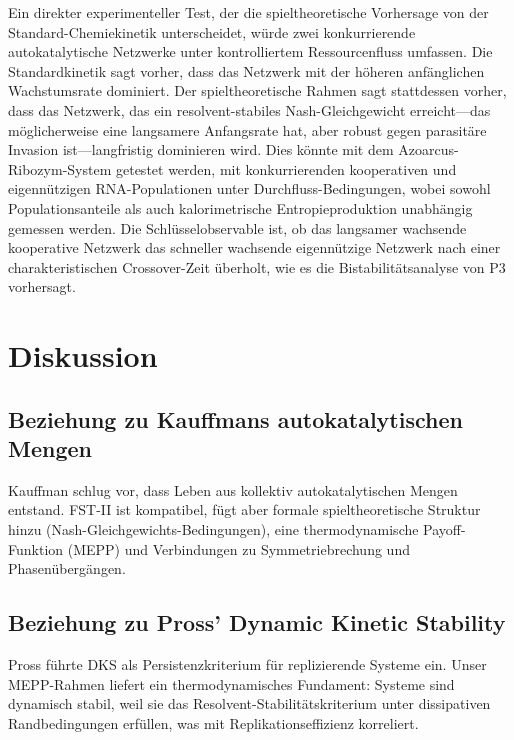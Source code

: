 \documentclass[12pt,a4paper]{article}
\theoremstyle{remark}
\begin{document}
Ein direkter experimenteller Test, der die spieltheoretische Vorhersage von der Standard-Chemiekinetik unterscheidet, w\"urde zwei konkurrierende autokatalytische Netzwerke unter kontrolliertem Ressourcenfluss umfassen. Die Standardkinetik sagt vorher, dass das Netzwerk mit der h\"oheren anf\"anglichen Wachstumsrate dominiert. Der spieltheoretische Rahmen sagt stattdessen vorher, dass das Netzwerk, das ein resolvent-stabiles Nash-Gleichgewicht erreicht---das m\"oglicherweise eine langsamere Anfangsrate hat, aber robust gegen parasit\"are Invasion ist---langfristig dominieren wird. Dies k\"onnte mit dem Azoarcus-Ribozym-System getestet werden, mit konkurrierenden kooperativen und eigenn\"utzigen RNA-Populationen unter Durchfluss-Bedingungen, wobei sowohl Populationsanteile als auch kalorimetrische Entropieproduktion unabh\"angig gemessen werden. Die Schl\"usselobservable ist, ob das langsamer wachsende kooperative Netzwerk das schneller wachsende eigenn\"utzige Netzwerk nach einer charakteristischen Crossover-Zeit \"uberholt, wie es die Bistabilit\"atsanalyse von P3 vorhersagt.

\section{Diskussion}
\label{sec:discussion}

\subsection{Beziehung zu Kauffmans autokatalytischen Mengen}

Kauffman \citep{Kauffman1993} schlug vor, dass Leben aus kollektiv autokatalytischen Mengen entstand. FST-II ist kompatibel, f\"ugt aber formale spieltheoretische Struktur hinzu (Nash-Gleichgewichts-Bedingungen), eine thermodynamische Payoff-Funktion (MEPP) und Verbindungen zu Symmetriebrechung und Phasen\"uberg\"angen.

\subsection{Beziehung zu Pross' Dynamic Kinetic Stability}

Pross \citep{Pross2012} f\"uhrte DKS als Persistenzkriterium f\"ur replizierende Systeme ein. Unser MEPP-Rahmen liefert ein thermodynamisches Fundament: Systeme sind dynamisch stabil, weil sie das Resolvent-Stabilit\"atskriterium unter dissipativen Randbedingungen erf\"ullen, was mit Replikationseffizienz korreliert.
\end{document}

